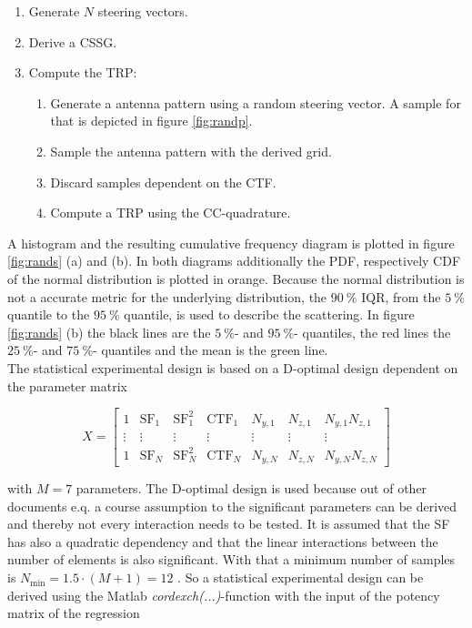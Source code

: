 \begin{enumerate}
\item Generate $N$ steering vectors.
\item Derive a \ac{CSSG}.
\item Compute the \ac{TRP}:
\begin{enumerate}
\item Generate a antenna pattern using a random steering vector. A sample for that is depicted in figure \ref{fig:randp}.
\item Sample the antenna pattern with the derived grid.
\item Discard samples dependent on the \ac{CTF}.
\item Compute a \ac{TRP} using the \ac{CC}-quadrature.
\end{enumerate}
\end{enumerate}

A histogram and the resulting cumulative frequency diagram is plotted in figure \ref{fig:rands} (a) and (b). In both diagrams additionally the \ac{PDF}, respectively \ac{CDF} of the normal distribution is plotted in orange. Because the normal distribution is not a accurate metric for the underlying distribution, the $\SI{90}{\percent}$ \ac{IQR}, from the $\SI{5}{\percent}$ quantile to the $\SI{95}{\percent}$ quantile, is used to describe the scattering. In figure \ref{fig:rands} (b) the black lines are the $\SI{5}{\percent}$- and $\SI{95}{\percent}$- quantiles, the red lines the $\SI{25}{\percent}$- and $\SI{75}{\percent}$- quantiles and the mean is the green line.\\
The statistical experimental design is based on a D-optimal design dependent on the parameter matrix

\begin{equation}
X = \begin{bmatrix}
1 & \text{SF}_1 & \text{SF}_1^2 & \text{CTF}_1 & N_{y,1} & N_{z,1} & N_{y,1}N_{z,1}\\
\vdots & \vdots & \vdots & \vdots & \vdots & \vdots & \vdots\\
1 & \text{SF}_N & \text{SF}_N^2 & \text{CTF}_N & N_{y,N} & N_{z,N} & N_{y,N}N_{z,N}
\end{bmatrix}
\label{eq:parammatrix}
\end{equation}

with $M=7$ parameters. The D-optimal design is used because out of other documents e.q. \cite{2018arXiv180310993F} a course assumption to the significant parameters can be derived and thereby not every interaction needs to be tested. It is assumed that the \ac{SF} has also a quadratic dependency and that the linear interactions between the number of elements is also significant. With that a minimum number of samples is $N_\text{min}=1.5\cdot\left(M+1\right)=12$ \cite{dffs}. So a statistical experimental design can be derived using the Matlab\texttrademark{} \textit{cordexch(...)}-function with the input of the potency matrix of the regression

